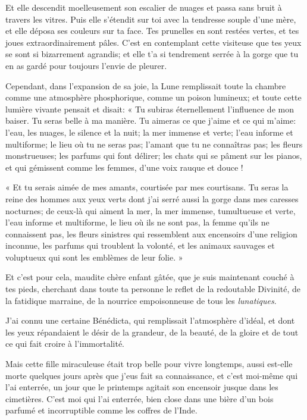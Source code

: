 Et elle descendit moelleusement son escalier de nuages et passa sans
bruit à travers les vitres. Puis elle s’étendit sur
toi avec la tendresse souple d’une mère, et elle
déposa ses couleurs sur ta face. Tes prunelles en sont restées vertes,
et tes joues extraordinairement pâles. C’est en
contemplant cette visiteuse que tes yeux se sont si bizarrement
agrandis; et elle t’a si tendrement serrée à la gorge
que tu en as gardé pour toujours l’envie de pleurer.

Cependant, dans l’expansion de sa joie, la Lune
remplissait toute la chambre comme une atmosphère phosphorique, comme
un poison lumineux; et toute cette lumière vivante pensait et disait: «
Tu subiras éternellement l’influence de mon baiser. Tu
seras belle à ma manière. Tu aimeras ce que j’aime et
ce qui m’aime: l’eau, les nuages, le
silence et la nuit; la mer immense et verte; l’eau
informe et multiforme; le lieu où tu ne seras pas;
l’amant que tu ne connaîtras pas; les fleurs
monstrueuses; les parfums qui font délirer; les chats qui se pâment sur
les pianos, et qui gémissent comme les femmes, d’une
voix rauque et douce !

« Et tu serais aimée de mes amants, courtisée par mes courtisans. Tu
seras la reine des hommes aux yeux verts dont j’ai
serré aussi la gorge dans mes caresses nocturnes; de ceux{}-là qui
aiment la mer, la mer immense, tumultueuse et verte,
l’eau informe et multiforme, le lieu où ils ne sont
pas, la femme qu’ils ne connaissent pas, les fleurs
sinistres qui ressemblent aux encensoirs d’une
religion inconnue, les parfums qui troublent la volonté, et les animaux
sauvages et voluptueux qui sont les emblèmes de leur folie. »

Et c’est pour cela, maudite chère enfant gâtée, que je
suis maintenant couché à tes pieds, cherchant dans toute ta personne le
reflet de la redoutable Divinité, de la fatidique marraine, de la
nourrice empoisonneuse de tous les \textit{lunatiques}.


J’ai connu une certaine Bénédicta, qui remplissait
l’atmosphère d’idéal, et dont les
yeux répandaient le désir de la grandeur, de la beauté, de la gloire et
de tout ce qui fait croire à l’immortalité.

Mais cette fille miraculeuse était trop belle pour vivre longtemps,
aussi est{}-elle morte quelques jours après que j’eus
fait sa connaissance, et c’est moi{}-même qui
l’ai enterrée, un jour que le printemps agitait son
encensoir jusque dans les cimetières. C’est moi qui
l’ai enterrée, bien close dans une bière
d’un bois parfumé et incorruptible comme les coffres
de l’Inde.

